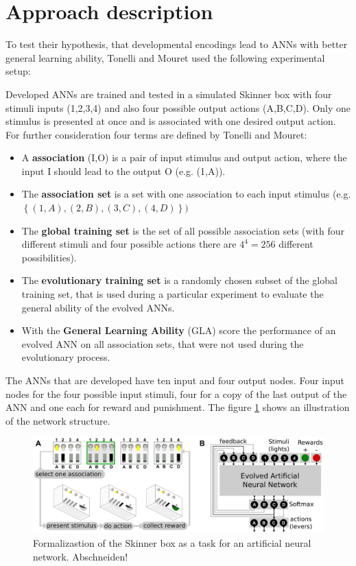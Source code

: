 \documentclass[12pt,twoside]{article}
\theoremstyle{plain}
\theoremstyle{definition}
\theoremstyle{remark}
\begin{document}
\section{Approach description}
\label{sec:model}
To test their hypothesis, that developmental encodings lead to ANNs with better general learning ability, Tonelli and Mouret used the following experimental setup:\medskip

Developed ANNs are trained and tested in a simulated Skinner box with four stimuli inputs (1,2,3,4) and also four possible output actions (A,B,C,D). Only one stimulus is presented at once and is associated with one desired output action.
For further consideration four terms are defined by Tonelli and Mouret:
\begin{itemize}
	\item A \textbf{association} (I,O) is a pair of input stimulus and output action, where the input I should lead to the output O (e.g. (1,A)).
	\item The \textbf{association set} is a set with one association to each input stimulus (e.g. $\left\{(1,A),(2,B),(3,C),(4,D)\right\})$
	\item The \textbf{global training set} is the set of all possible association sets (with four different stimuli and four possible actions there are $4^4 = 256$ different possibilities).
	\item The \textbf{evolutionary training set} is a randomly chosen subset of the global training set, that is used during a particular experiment to evaluate the general  ability of the evolved ANNs.
	\item With the \textbf{General Learning Ability} (GLA) score the performance of an evolved ANN on all association sets, that were not used during the evolutionary process.
\end{itemize}

The ANNs that are developed have ten input and four output nodes. Four input nodes for the four possible input stimuli, four for a copy of the last output of the ANN and one each for reward and punishment.
The figure \ref{fig:formalization} shows an illustration of the network structure.

\begin{figure}[h]
	\begin{center}
		\includegraphics[width=.9\textwidth]{network_structure.png}
	\end{center}
	\caption{Formalizastion of the Skinner box as a task for an artificial neural network. Abschneiden!}
	\label{fig:formalization}
\end{figure}
\end{document}
